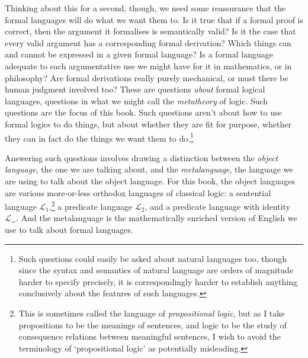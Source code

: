 \documentclass[openany,leqno,11pt,draft]{book}
\theoremstyle{break}
\theoremstyle{definition}
\theoremstyle{remark}
\newcommand{\lone}{\ensuremath{\mathcal{L}_{1}}}
\newcommand{\ltwo}{\ensuremath{\mathcal{L}_{2}}}
\newcommand{\lequ}{\ensuremath{\mathcal{L}_{=}}}
\begin{document}
Thinking about this for a second, though, we need some reassurance that the formal languages will do what we want them to. Is it true that if a formal proof is correct, then the argument it formalises is semantically valid? Is it the case that every valid argument has a corresponding formal derivation? Which things can and cannot be expressed in a given formal language? Is a formal language adequate to each argumentative use we might have for it in mathematics, or in philosophy? Are formal derivations really purely mechanical, or must there be human judgment involved too? These are questions \emph{about} formal logical languages, questions in what we might call the \emph{metatheory} of logic. Such questions are the focus of this book. Such questions aren't about how to use formal logics to do things, but about whether they are fit for purpose, whether they can in fact do the things we want them to do.\footnote{Such questions could easily be asked about natural languages too, though since the syntax and semantics of natural language are orders of magnitude harder to specify precisely, it is correspondingly harder to establish anything conclusively about the features of such languages.}

Answering such questions involves drawing a distinction between the \emph{object language}, the one we are talking about, and the \emph{metalanguage}, the language we are using to talk about the object language. For this book, the object languages are various more-or-less orthodox languages of classical logic: a sentential language \lone,\footnote{This is sometimes called the language of \emph{propositional logic}, but as I take propositions to be the meanings of sentences, and logic to be the study of consequence relations between meaningful sentences, I wish to avoid the terminology of `propositional logic' as potentially misleading.} a predicate language \ltwo, and a predicate language with identity \lequ. And the metalanguage is the mathematically enriched version of English we use to talk about formal languages. 
\end{document}
